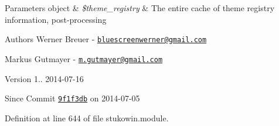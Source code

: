 \begin{DoxyParams}[1]{Parameters}
object & {\em \$theme\+\_\+registry} & The entire cache of theme registry information, post-\/processing\\
\hline
\end{DoxyParams}
\begin{DoxyAuthor}{Authors}
Werner Breuer -\/ \href{mailto:bluescreenwerner@gmail.com}{\tt bluescreenwerner@gmail.\+com} 

Markus Gutmayer -\/ \href{mailto:m.gutmayer@gmail.com}{\tt m.\+gutmayer@gmail.\+com} 
\end{DoxyAuthor}
\begin{DoxyVersion}{Version}
1.. 2014-\/07-\/16 
\end{DoxyVersion}
\begin{DoxySince}{Since}
Commit \href{http://github.com/TheJake123/DrupalModul/commit/9f1f3db3b94f0c44518af0f58401bac46f41d7cb}{\tt 9f1f3db} on 2014-\/07-\/05 
\end{DoxySince}


Definition at line 644 of file stukowin.\+module.

